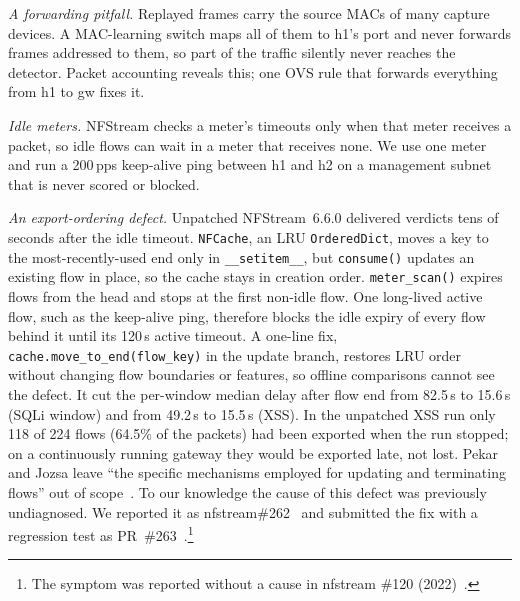 \emph{A forwarding pitfall.} Replayed frames carry the source MACs of many capture devices. A MAC-learning switch maps all of them to h1's port and never forwards frames addressed to them, so part of the traffic silently never reaches the detector. Packet accounting reveals this; one OVS rule that forwards everything from h1 to gw fixes it.

\emph{Idle meters.} NFStream checks a meter's timeouts only when that meter receives a packet, so idle flows can wait in a meter that receives none. We use one meter and run a 200\,pps keep-alive ping between h1 and h2 on a management subnet that is never scored or blocked.

\emph{An export-ordering defect.} Unpatched NFStream~6.6.0 delivered verdicts tens of seconds after the idle timeout. \texttt{NFCache}, an LRU \texttt{OrderedDict}, moves a key to the most-recently-used end only in \texttt{\_\_setitem\_\_}, but \texttt{consume()} updates an existing flow in place, so the cache stays in creation order. \texttt{meter\_scan()} expires flows from the head and stops at the first non-idle flow. One long-lived active flow, such as the keep-alive ping, therefore blocks the idle expiry of every flow behind it until its 120\,s active timeout. A one-line fix, \texttt{cache.move\_to\_end(flow\_key)} in the update branch, restores LRU order without changing flow boundaries or features, so offline comparisons cannot see the defect. It cut the per-window median delay after flow end from 82.5\,s to 15.6\,s (SQLi window) and from 49.2\,s to 15.5\,s (XSS). In the unpatched XSS run only 118 of 224 flows (64.5\% of the packets) had been exported when the run stopped; on a continuously running gateway they would be exported late, not lost. Pekar and Jozsa leave ``the specific mechanisms employed for updating and terminating flows'' out of scope~\cite{pekar2024integrity}. To our knowledge the cause of this defect was previously undiagnosed. We reported it as nfstream\#262~\cite{nfstream262} and submitted the fix with a regression test as PR~\#263~\cite{nfstream263}.\footnote{The symptom was reported without a cause in nfstream \#120 (2022)~\cite{nfstream120}.}

